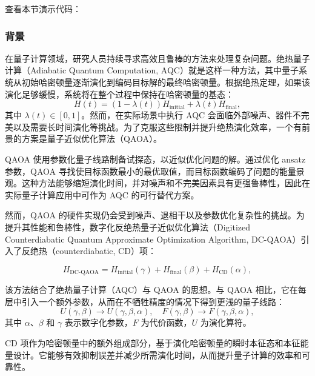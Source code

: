 

查看本节演示代码： \ 

\subsubsection{背景}
在量子计算领域，研究人员持续寻求高效且鲁棒的方法来处理复杂问题。绝热量子计算（Adiabatic Quantum Computation, AQC）就是这样一种方法，其中量子系统从初始哈密顿量逐渐演化到编码目标解的最终哈密顿量。根据绝热定理，如果该演化足够缓慢，系统将在整个过程中保持在哈密顿量的基态：
\begin{equation}
    H(t) = (1-\lambda(t))H_{\text{initial}} + \lambda(t)H_{\text{final}},
\end{equation}
其中 \(\lambda(t) \in [0, 1]\)。然而，在实际场景中执行 AQC 会面临外部噪声、器件不完美以及需要长时间演化等挑战。为了克服这些限制并提升绝热演化效率，一个有前景的方案是量子近似优化算法（QAOA）。

QAOA 使用参数化量子线路制备试探态，以近似优化问题的解。通过优化 ansatz 参数，QAOA 寻找使目标函数最小的最优取值，而目标函数编码了问题的能量景观。这种方法能够缩短演化时间，并对噪声和不完美因素具有更强鲁棒性，因此在实际量子计算应用中可作为 AQC 的可行替代方案。

然而，QAOA 的硬件实现仍会受到噪声、退相干以及参数优化复杂性的挑战。为提升其性能和鲁棒性，数字化反绝热量子近似优化算法（Digitized Counterdiabatic Quantum Approximate Optimization Algorithm, DC-QAOA）引入了反绝热（counterdiabatic, CD）项：

\begin{equation}
    H_{\text{DC-QAOA}} = H_{\text{initial}}(\gamma) + H_{\text{final}}(\beta) + H_{\text{CD}}(\alpha),
\end{equation}

该方法结合了绝热量子计算（AQC）与 QAOA 的思想。与 QAOA 相比，它在每层中引入一个额外参数，从而在不牺牲精度的情况下得到更浅的量子线路：
\begin{equation}
    \label{eq:evo operator}
    U(\gamma, \beta) \to U(\gamma, \beta, \alpha), \quad F(\gamma, \beta) \to F(\gamma, \beta, \alpha),
\end{equation}
其中 \(\alpha\)、\(\beta\) 和 \(\gamma\) 表示数字化参数，\(F\) 为代价函数，\(U\) 为演化算符。

CD 项作为哈密顿量中的额外组成部分，基于演化哈密顿量的瞬时本征态和本征能量设计。它能够有效抑制误差并减少所需演化时间，从而提升量子计算的效率和可靠性。

